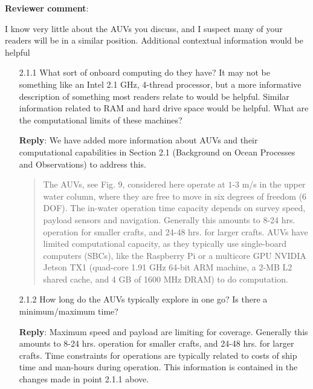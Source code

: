 \documentclass[a4paper]{article}
\def\revcom{\textbf{Reviewer comment}}
\def\reply{\textbf{Reply}}
\begin{document}
\begin{answers}
\item{\revcom : }\label{r2c1}

I know very little about the AUVs you discuss, and I suspect many of your readers will be in a similar position. Additional contextual information would be helpful

\begin{itemize}[noitemsep,topsep=0pt,parsep=0pt,partopsep=0pt]

\item[2.1.1] What sort of onboard computing do they have? It may not be something like an Intel 2.1 GHz, 4-thread processor, but a more informative description of something most readers relate to would be helpful. Similar information related to RAM and hard drive space would be helpful. What are the computational limits of these machines?\par

\reply: We have added more information about AUVs and their computational capabilities in Section 2.1 (Background on Ocean Processes and Observations) to address this. 
\begin{quote}
The AUVs, see Fig. 9, considered here operate at $1$-$3$ m/s in the upper water column, where they are free to move in six degrees of freedom (6 DOF). The in-water operation time capacity depends on survey speed, payload sensors and navigation. Generally this amounts to 8-24 hrs. operation for smaller crafts, and 24-48 hrs. for larger crafts. AUVs have limited computational capacity, as they typically use single-board computers (SBCs), like the Raspberry Pi or a multicore GPU NVIDIA Jetson TX1 (quad-core 1.91 GHz 64-bit ARM machine, a 2-MB L2 shared cache, and 4 GB of 1600 MHz DRAM) to do computation. 
\end{quote}
\vspace{1em}

\item[2.1.2] How long do the AUVs typically explore in one go? Is there a minimum/maximum time?\par 

\reply: Maximum speed and payload are limiting for coverage. Generally this amounts to 8-24 hrs. operation for smaller crafts, and 24-48 hrs. for larger crafts. Time constraints for operations are typically related to costs of ship time and man-hours during operation. This information is contained in the changes made in point 2.1.1 above. 
\vspace{1em}


\end{itemize}
\end{answers}
\end{document}
